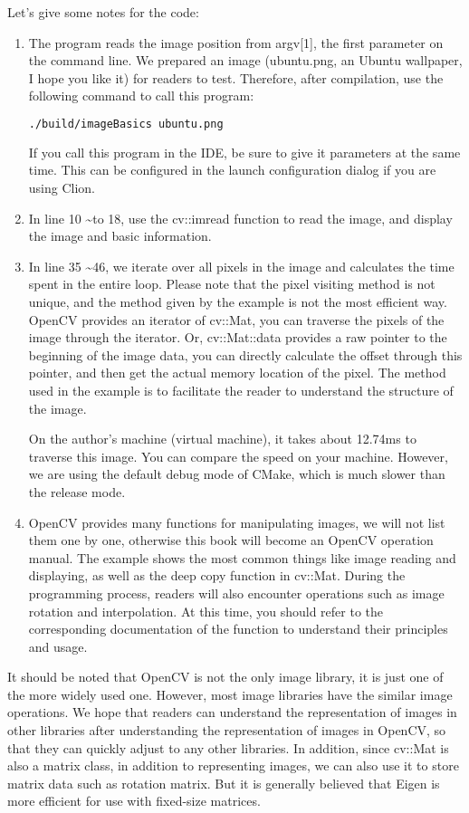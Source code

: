 Let's give some notes for the code:
\begin{enumerate}
\item The program reads the image position from argv[1], the first parameter on the command line. We prepared an image (ubuntu.png, an Ubuntu wallpaper, I hope you like it) for readers to test. Therefore, after compilation, use the following command to call this program:
\begin{lstlisting}[language=sh, caption=Terminal input:]
./build/imageBasics ubuntu.png
\end{lstlisting}
If you call this program in the IDE, be sure to give it parameters at the same time. This can be configured in the launch configuration dialog if you are using Clion.
\item In line 10 \textasciitilde to 18, use the cv::imread function to read the image, and display the image and basic information.
\item In line 35 \textasciitilde 46, we iterate over all pixels in the image and calculates the time spent in the entire loop. Please note that the pixel visiting method is not unique, and the method given by the example is not the most efficient way. OpenCV provides an iterator of cv::Mat, you can traverse the pixels of the image through the iterator. Or, cv::Mat::data provides a raw pointer to the beginning of the image data, you can directly calculate the offset through this pointer, and then get the actual memory location of the pixel. The method used in the example is to facilitate the reader to understand the structure of the image.

On the author's machine (virtual machine), it takes about 12.74ms to traverse this image. You can compare the speed on your machine. However, we are using the default debug mode of CMake, which is much slower than the release mode.

\item OpenCV provides many functions for manipulating images, we will not list them one by one, otherwise this book will become an OpenCV operation manual. The example shows the most common things like image reading and displaying, as well as the deep copy function in cv::Mat. During the programming process, readers will also encounter operations such as image rotation and interpolation. At this time, you should refer to the corresponding documentation of the function to understand their principles and usage.
\end{enumerate}

It should be noted that OpenCV is not the only image library, it is just one of the more widely used one. However, most image libraries have the similar image operations. We hope that readers can understand the representation of images in other libraries after understanding the representation of images in OpenCV, so that they can quickly adjust to any other libraries. In addition, since cv::Mat is also a matrix class, in addition to representing images, we can also use it to store matrix data such as rotation matrix. But it is generally believed that Eigen is more efficient for use with fixed-size matrices.

